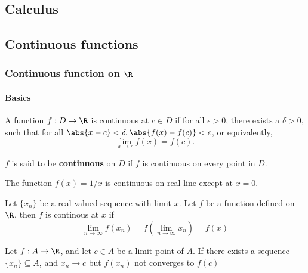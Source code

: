 \begin{refsection}
\startcontents[chapters]	
\chapter{Calculus}\label{ch:calculus}

\section{Continuous functions}
\subsection{Continuous function on $\R$}
\subsubsection{Basics}
\begin{definition}[continuity]
\cite[122]{abbott2001understanding}\cite[53]{fitzpatrick2006advanced}

 A function $f:D\to \R$ is continuous at $c\in D$ if for all $\epsilon > 0$, there exists a $\delta > 0$, such that for all $\abs{x-c} < \delta, \abs{f(x)-f(c)} < \epsilon$, or equivalently, 
$$\lim_{x\to c}f(x) = f(c).$$

$f$ is said to be \textbf{continuous} on $D$ if $f$ is continuous on every point in $D$.
\end{definition}

\begin{example}
The function $f(x)=1/x$ is continuous on real line except at $x=0$. 
\end{example}

\begin{definition}
\cite[123]{abbott2001understanding} Let $\{x_n\}$ be a real-valued sequence with limit $x$. Let $f$ be a function defined on $\R$, then $f$ is continous at $x$ if
$$\lim_{n\to \infty} f(x_n) = f(\lim_{n\to\infty} x_n) = f(x)$$
\end{definition}

\begin{corollary}
\cite[123]{abbott2001understanding}Let $f:A\to \R$, and let $c\in A$ be a limit point of $A$. If there exists a sequence $\{x_n\} \subseteq A$, and $x_n \to c$ but $f(x_n)$ not converges to $f(c)$
\end{corollary}


\end{refsection}
